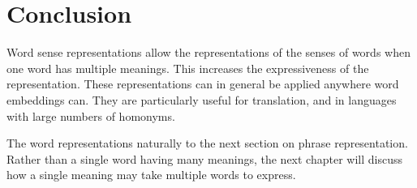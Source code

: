 \documentclass[12pt,parskip]{komatufte}
\begin{document}
\section{Conclusion}

Word sense representations allow the representations of the senses of words when one word has multiple meanings.
This increases the expressiveness of the representation.
These representations can in general be applied anywhere word embeddings can.
They are particularly useful for translation,
and in languages with large numbers of homonyms.

The word representations naturally to the next section on phrase representation. Rather than a single word having many meanings, the next chapter will discuss how a single meaning may take multiple words to express.
\end{document}
